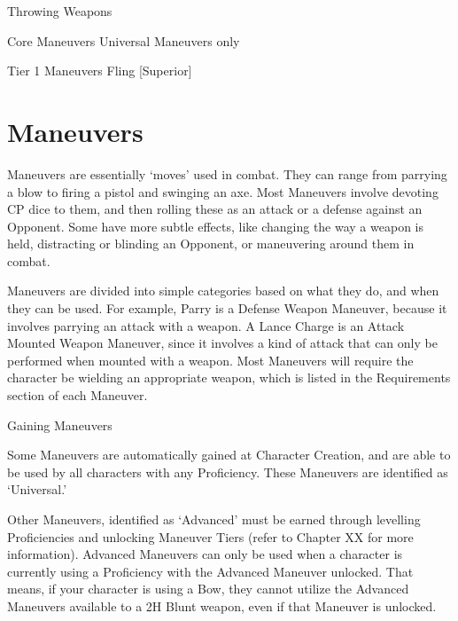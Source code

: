\documentclass[oneside,11pt,english]{book}
\begin{document}
 

Throwing Weapons 

 

Core Maneuvers 
Universal Maneuvers only 

 

Tier 1 Maneuvers 
Fling [Superior] 

 

\chapter{Maneuvers}\label{ch:maneuvers}
\clearpage

Maneuvers are essentially ‘moves’ used in combat. They can range from parrying a blow to firing a pistol 
and swinging an axe. Most Maneuvers involve devoting CP dice to them, and then rolling these as an 
attack or a defense against an Opponent. Some have more subtle effects, like changing the way a weapon 
is held, distracting or blinding an Opponent, or maneuvering around them in combat. 

 

Maneuvers are divided into simple categories based on what they do, and when they can be used. For 
example, Parry is a Defense Weapon Maneuver, because it involves parrying an attack with a weapon. A 
Lance Charge is an Attack Mounted Weapon Maneuver, since it involves a kind of attack that can only be 
performed when mounted with a weapon. Most Maneuvers will require the character be wielding an 
appropriate weapon, which is listed in the Requirements section of each Maneuver. 

 

Gaining Maneuvers 

 

Some Maneuvers are automatically gained at Character Creation, and are able to be used by all characters 
with any Proficiency. These Maneuvers are identified as ‘Universal.’ 

 

Other Maneuvers, identified as ‘Advanced’ must be earned through levelling Proficiencies and unlocking 
Maneuver Tiers (refer to Chapter XX for more information). Advanced Maneuvers can only be used 
when a character is currently using a Proficiency with the Advanced Maneuver unlocked. That means, if 
your character is using a Bow, they cannot utilize the Advanced Maneuvers available to a 2H Blunt 
weapon, even if that Maneuver is unlocked. 

 

 
\end{document}
